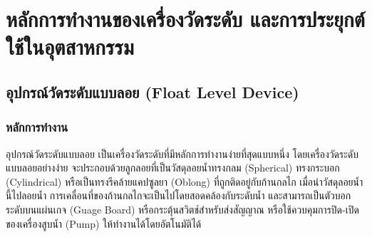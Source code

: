 \documentclass[final,11pt]{article}
\begin{document}
\newpage
\section{หลักการทำงานของเครื่องวัดระดับ และการประยุกต์ใช้ในอุตสาหกรรม}
\subsection{อุปกรณ์วัดระดับแบบลอย (Float Level Device)}
\subsubsection{หลักการทำงาน} 
อุปกรณ์วัดระดับแบบลอย เป็นเครื่องวัดระดับที่มีหลักการทำงานง่ายที่สุดแบบหนึ่ง
โดยเครื่องวัดระดับแบบลอยอย่างง่าย จะประกอบด้วยลูกลอยที่เป็นวัสดุลอยน้ำทรงกลม (Spherical) ทรงกระบอก (Cylindrical)
หรือเป็นทรงรีคล้ายแคปซูลยา (Oblong) ที่ถูกติดอยู่กับก้านกลไก เมื่อนำวัสดุลอยน้ำนี้ไปลอยน้ำ การเคลื่อนที่ของก้านกลไกจะเป็นไปโดยสอดคล้องกับระดับน้ำ
และสามารถเป็นตัวบอกระดับบนแผ่นเกจ (Guage Board) หรือกระตุ้นสวิตช์สำหรับส่งสัญญาณ หรือใช้ควบคุมการปิด-เปิดของเครื่องสูบน้ำ (Pump) ให้ทำงานได้โดยอัตโนมัติได้  
\end{document}
